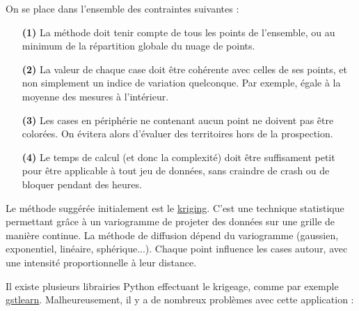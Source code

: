 \documentclass[12pt]{article}
\begin{document}
    On se place dans l'ensemble des contraintes suivantes :
    \begin{enumerate}
        \item[\textbf{(1)}] La méthode doit tenir compte de tous les points de l'ensemble, ou au minimum de la répartition globale du nuage de points.
        \item[\textbf{(2)}] La valeur de chaque case doit être cohérente avec celles de ses points, et non simplement un indice de variation quelconque. Par exemple, égale à la moyenne des mesures à l'intérieur.
        \item[\textbf{(3)}] Les cases en périphérie ne contenant aucun point ne doivent pas être colorées. On évitera alors d'évaluer des territoires hors de la prospection.
        \item[\textbf{(4)}] Le temps de calcul (et donc la complexité) doit être suffisament petit pour être applicable à tout jeu de données, sans craindre de crash ou de bloquer pendant des heures.
    \end{enumerate}

    Le méthode suggérée initialement est le \href{https://www.publichealth.columbia.edu/research/population-health-methods/kriging-interpolation#:~:text=Kriging%20is%20one%20of%20several,over%20a%20continuous%20spatial%20field.}{kriging}. C'est une technique statistique permettant grâce à un variogramme de projeter des données sur une grille de manière continue. La méthode de diffusion dépend du variogramme (gaussien, exponentiel, linéaire, sphérique...). Chaque point influence les cases autour, avec une intensité proportionnelle à leur distance.

    Il existe plusieurs librairies Python effectuant le krigeage, comme par exemple \href{https://gstlearn.org/}{gstlearn}. Malheureusement, il y a de nombreux problèmes avec cette application :
\end{document}

